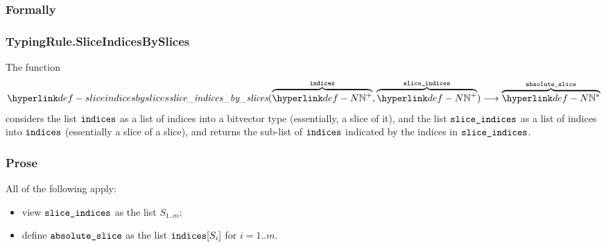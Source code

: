 \subsubsection{Formally}
\begin{mathpar}
\end{mathpar}

\subsubsection{TypingRule.SliceIndicesBySlices\label{sec:TypingRule.SliceIndicesBySlices}}
\hypertarget{def-sliceindicesbyslices}{}
The function
\[
\sliceindicesbyslices(\overname{\N^+}{\indices}, \overname{\N^+}{\sliceindices})
\aslto \overname{\N^*}{\vabsslice}
\]
considers the list $\indices$ as a list of indices into a bitvector type (essentially, a slice of it),
and the list $\sliceindices$ as a list of indices into $\indices$ (essentially a slice of a slice),
and returns the sub-list of $\indices$ indicated by the indices in $\sliceindices$.

\subsubsection{Prose}
All of the following apply:
\begin{itemize}
  \item view $\sliceindices$ as the list $S_{1..m}$;
  \item define $\vabsslice$ as the list $\indices[S_i]$ for $i=1..m$.
\end{itemize}

